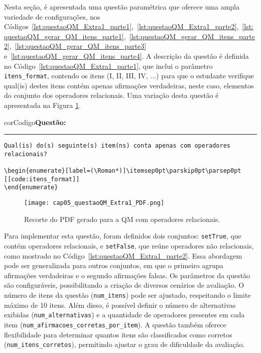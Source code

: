 Nesta seção, é apresentada uma questão paramétrica que oferece uma ampla variedade de configurações, nos Códigos~\ref{lst:questaoQM_Extra1_parte1},~\ref{lst:questaoQM_Extra1_parte2},~\ref{lst:questaoQM_gerar_QM_itens_parte1},~\ref{lst:questaoQM_gerar_QM_itens_parte2},~\ref{lst:questaoQM_gerar_QM_itens_parte3} e~\ref{lst:questaoQM_gerar_QM_itens_parte4}.
%
A descrição da questão é definida no Código~\ref{lst:questaoQM_Extra1_parte1}, que inclui o parâmetro \verb|itens_format|, contendo os itens (I, II, III, IV, \(\ldots\)) para que o estudante verifique qual(is) destes itens contém apenas afirmações verdadeiras, neste caso, elementos do conjunto dos operadores relacionais. Uma variação desta questão é apresentada na Figura \ref{fig:questaoQM_Extra1_PDF}.

\begin{listing}[!ht]
    \begin{myboxCode}{corCodigo}{\textbf{Questão: }}\vspace{3mm}
    \hrule
    \begin{verbatim}
Qual(is) do(s) seguinte(s) item(ns) conta apenas com operadores relacionais?

\begin{enumerate}[label=(\Roman*)]\itemsep0pt\parskip0pt\parsep0pt
[[code:itens_format]]
\end{enumerate}
\end{verbatim}
\end{myboxCode}
\caption{Exemplo de QM paramétrica de operadores relacionais -- Parte 1: Descrição de questão.}
\label{lst:questaoQM_Extra1_parte1}
\end{listing}

\begin{figure}[!ht]
    \texttt{[image: cap05\_questaoQM\_Extra1\_PDF.png]}
    \caption{Recorte do PDF gerado para a QM com operadores relacionais.}
    \label{fig:questaoQM_Extra1_PDF}
\end{figure}

Para implementar esta questão, foram definidos dois conjuntos: \verb|setTrue|, que contém operadores relacionais, e \verb|setFalse|, que reúne operadores não relacionais, como mostrado no Código~\ref{lst:questaoQM_Extra1_parte2}. Essa abordagem pode ser generalizada para outros conjuntos, em que o primeiro agrupa afirmações verdadeiras e o segundo afirmações falsas. Os parâmetros da questão são configuráveis, possibilitando a criação de diversos cenários de avaliação. O número de itens da questão (\verb|num_itens|) pode ser ajustado, respeitando o limite máximo de 10 itens. Além disso, é possível definir o número de alternativas exibidas (\verb|num_alternativas|) e a quantidade de operadores presentes em cada item (\verb|num_afirmacoes_corretas_por_item|). A questão também oferece flexibilidade para determinar quantos itens são classificados como corretos (\verb|num_itens_corretos|), permitindo ajustar o grau de dificuldade da avaliação.

